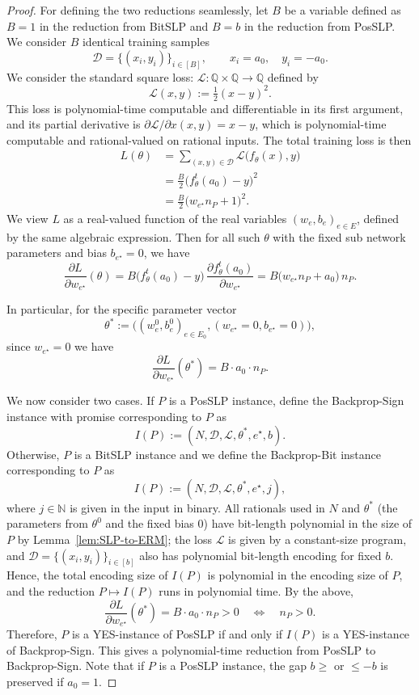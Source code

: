 \documentclass{article}
\newcommand{\cL}{\mathcal{L}}
\newcommand{\cD}{\mathcal{D}}
\theoremstyle{plain}
\theoremstyle{definition}
\theoremstyle{remark}
\begin{document}
\begin{proof}
For defining the two reductions seamlessly, let $B$ be a variable defined as $B= 1$ in the reduction from BitSLP and $B = b$ in the reduction from PosSLP.
We consider $B$ identical training samples
\[
\cD = \{(x_i,y_i)\}_{i \in [B]},\qquad x_i=a_0,\quad y_i=-a_0.
\]
We consider the standard square loss: $\cL:\mathbb{Q}\times\mathbb{Q}\to\mathbb{Q}$ defined by
\[
\cL(x,y) := \tfrac{1}{2}(x-y)^2.
\]
This loss is polynomial-time computable and differentiable in its first
argument, and its partial derivative is
$\partial \cL/\partial x(x,y) = x-y$, which is polynomial-time computable
and rational-valued on rational inputs. The total training loss is then
\[
\begin{aligned}
	L(\theta)
	&= \sum_{(x,y)\in\cD} \cL\bigl(f_\theta(x),y\bigr) \\
	&= \tfrac{B}{2}\bigl(f^t_\theta(a_0)-y\bigr)^2 \\
	&= \tfrac{B}{2}\bigl(w_{e^\star} n_P + 1\bigr)^2.
\end{aligned}
\]
We view $L$ as a real-valued function of the real variables
$(w_e,b_e)_{e\in E}$, defined by the same algebraic expression. Then for
all such $\theta$ with the fixed sub network parameters and bias
$b_{e^\star}=0$, we have
\[
\frac{\partial L}{\partial w_{e^\star}}(\theta)
= B \bigl(f^t_\theta(a_0)-y\bigr)\,\frac{\partial f^t_\theta(a_0)}{\partial w_{e^\star}}
= B \bigl(w_{e^\star} n_P + a_0\bigr)\, n_P.
\]

In particular, for the specific parameter vector
\[
\theta^\ast := \bigl((w_e^0,b_e^0)_{e\in E_0},
(w_{e^\star}=0,b_{e^\star}=0)\bigr),
\]
since $w_{e^\star}=0$ we have
\[
\frac{\partial L}{\partial w_{e^\star}}(\theta^\ast)
= B \cdot a_0 \cdot n_P.
\]
	
	 We now consider two cases. If $P$ is a PosSLP instance, define the Backprop-Sign instance with promise corresponding to $P$ as
	\[
	I(P) := (N,\cD,\cL,\theta^\ast,e^\star,b).
	\]
    Otherwise, $P$ is a BitSLP instance and we define the Backprop-Bit instance corresponding to $P$ as
	\[
	I(P) := (N,\cD,\cL,\theta^\ast,e^\star,j),
	\]
    where $j \in \mathbb{N}$ is given in the input in binary.
	All rationals used in $N$ and $\theta^\ast$ (the parameters from
	$\theta^0$ and the fixed bias $0$) have bit-length polynomial in the
	size of $P$ by Lemma~\ref{lem:SLP-to-ERM}; the loss $\cL$ is given by a
	constant-size program, and $\cD = \{(x_i,y_i)\}_{i \in [b]}$ also has polynomial bit-length encoding for fixed $b$.
	Hence, the total encoding size of $I(P)$ is polynomial in the encoding
	size of $P$, and the reduction $P\mapsto I(P)$ runs in polynomial time.
	By the above,
	\[
	\frac{\partial L}{\partial w_{e^\star}}(\theta^\ast) = B \cdot a_0 \cdot n_P > 0
	\quad\Longleftrightarrow\quad n_P>0.
	\]
	Therefore, $P$ is a YES-instance of PosSLP if and only if $I(P)$ is a
	YES-instance of Backprop-Sign. This gives a polynomial-time
	reduction from PosSLP to Backprop-Sign. Note that if $P$ is a PosSLP instance, the gap $b\geq$ or $\leq -b$ is preserved if $a_0 = 1$. 
    

\end{proof}
\end{document}
